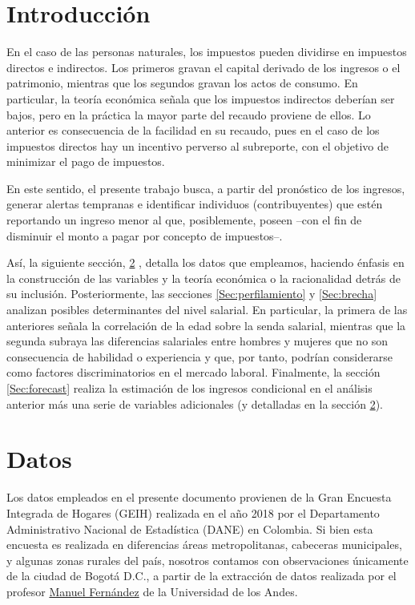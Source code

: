 \section{Introducción}
En el caso de las personas naturales, los impuestos pueden dividirse en impuestos directos e indirectos. Los primeros gravan el capital derivado de los ingresos o el patrimonio, mientras que los segundos gravan los actos de consumo. En particular, la teoría económica señala que los impuestos indirectos deberían ser bajos, pero en la práctica la mayor parte del recaudo proviene de ellos. Lo anterior es consecuencia de la facilidad en su recaudo, pues en el caso de los impuestos directos hay un incentivo perverso al subreporte, con el objetivo de minimizar el pago de impuestos. 

En este sentido, el presente trabajo busca, a partir del pronóstico de los ingresos, generar alertas tempranas e identificar individuos (contribuyentes) que estén reportando un ingreso menor al que, posiblemente, poseen --con el fin de disminuir el monto a pagar por concepto de impuestos--. %

Así, la siguiente sección, \ref{Sec:datos} , detalla los datos que empleamos, haciendo énfasis en la construcción de las variables y la teoría económica o la racionalidad detrás de su inclusión. Posteriormente, las secciones \ref{Sec:perfilamiento}  y \ref{Sec:brecha}  analizan posibles determinantes del nivel salarial. En particular, la primera de las anteriores señala la correlación de la edad sobre la senda salarial, mientras que la segunda subraya las diferencias salariales entre hombres y mujeres que no son consecuencia de habilidad o experiencia y que, por tanto, podrían considerarse como factores discriminatorios en el mercado laboral. Finalmente, la sección \ref{Sec:forecast}  realiza la estimación de los ingresos condicional en el análisis anterior más una serie de variables adicionales (y detalladas en la sección \ref{Sec:datos}).

\section{Datos} \label{Sec:datos}

Los datos empleados en el presente documento provienen de la  Gran Encuesta Integrada de Hogares (GEIH) realizada en el año 2018 por el Departamento Administrativo Nacional de Estadística (DANE) en Colombia. Si bien esta encuesta es realizada en diferencias áreas metropolitanas, cabeceras municipales, y algunas zonas rurales del país, nosotros contamos con observaciones únicamente de la ciudad de Bogotá D.C., a partir de la extracción de datos realizada por el profesor \href{https://man-fern.github.io/}{Manuel Fernández} de la Universidad de los Andes. \\

